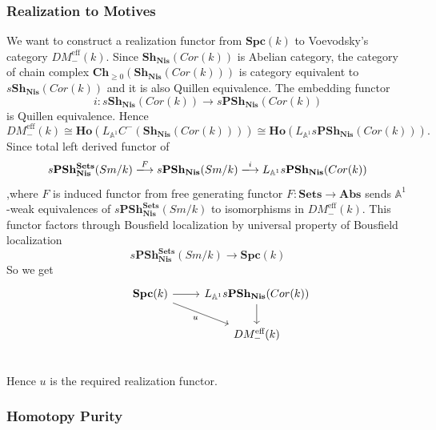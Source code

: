 \documentclass[b5paper,10pt]{article}
\begin{document}
\subsubsection{Realization to Motives}
We want to construct a realization functor from $\mathbf{Spc}(k)$ to Voevodsky's category $DM_{-}^{\text{eff}}(k)$.
Since $\mathbf{Sh_{Nis}}(Cor(k))$ is Abelian category, the category of chain complex $\mathbf{Ch}_{\geq 0}(\mathbf{Sh_{Nis}}(Cor(k)))$ is category equivalent to $s\mathbf{Sh_{Nis}}(Cor(k))$ and it is also Quillen equivalence. The embedding functor
\[
i \colon s\mathbf{Sh_{Nis}}(Cor(k)) \to s\mathbf{PSh_{Nis}}(Cor(k))
\]
is Quillen equivalence. 
Hence \[DM_{-}^{\text{eff}}(k) \cong \mathbf{Ho}(L_{\mathbb{A}^1}C^{-}(\mathbf{Sh_{Nis}}(Cor(k)))) \cong
 \mathbf{Ho}(L_{\mathbb{A}^1}s\mathbf{PSh_{Nis}}(Cor(k))).\]
 Since total left derived functor of 
 \[
 s\mathbf{PSh_{Nis}^{Sets}}(Sm/k) 
 \xlongrightarrow{F} s\mathbf{PSh_{Nis}}(Sm/k) \xlongrightarrow{i} L_{\mathbb{A}^1}s\mathbf{PSh_{Nis}}(Cor(k))
 \]
,where $F$ is induced functor from free generating functor $F \colon \mathbf{Sets} \to \mathbf{Abs}$ sends $\mathbb{A}^1$-weak equivalences of $s\mathbf{PSh_{Nis}^{Sets}}(Sm/k)$ to isomorphisms in  $DM_{-}^{\text{eff}}(k)$. This functor factors through Bousfield localization by universal property of Bousfield localization
\[
 s\mathbf{PSh_{Nis}^{Sets}}(Sm/k) \to \mathbf{Spc}(k)
\]
So we get 
\[
\begin{tikzcd}
&\mathbf{Spc}(k) \arrow[r] \arrow[rd,"u"']& L_{\mathbb{A}^1}s\mathbf{PSh_{Nis}}(Cor(k)) \arrow[d]\\
& & DM_{-}^{\text{eff}}(k)\\
\end{tikzcd}
\]
 Hence $u$ is the required realization functor.
\subsubsection{Homotopy Purity}
\end{document}
